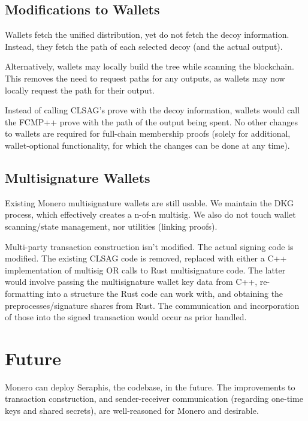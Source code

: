 \documentclass[]{article}
\begin{document}
\subsection{Modifications to Wallets}

Wallets fetch the unified distribution, yet do not fetch the decoy information. Instead, they fetch the path of each selected decoy (and the actual output).

Alternatively, wallets may locally build the tree while scanning the blockchain. This removes the need to request paths for any outputs, as wallets may now locally request the path for their output.

Instead of calling CLSAG's prove with the decoy information, wallets would call the FCMP++ prove with the path of the output being spent. No other changes to wallets are required for full-chain membership proofs (solely for additional, wallet-optional functionality, for which the changes can be done at any time).

\subsection{Multisignature Wallets}

Existing Monero multisignature wallets are still usable. We maintain the DKG process, which effectively creates a n-of-n multisig. We also do not touch wallet scanning/state management, nor utilities (linking proofs).

Multi-party transaction construction isn't modified. The actual signing code is modified. The existing CLSAG code is removed, replaced with either a C++ implementation of multisig OR calls to Rust multisignature code. The latter would involve passing the multisignature wallet key data from C++, re-formatting into a structure the Rust code can work with, and obtaining the preprocesses/signature shares from Rust. The communication and incorporation of those into the signed transaction would occur as prior handled.

\newpage

\section{Future}

Monero can deploy Seraphis, the codebase, in the future. The improvements to transaction construction, and sender-receiver communication (regarding one-time keys and shared secrets), are well-reasoned for Monero and desirable.
\end{document}
